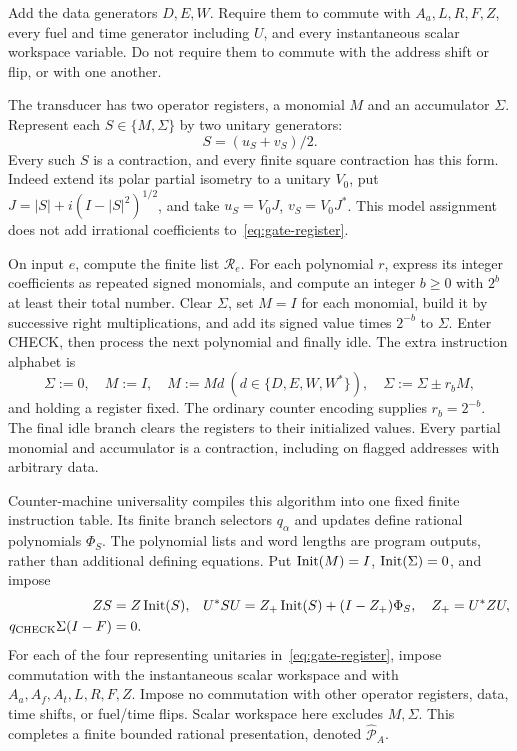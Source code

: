 Add the data generators $D,E,W$. Require them to commute with $A_a,L,R,F,Z$, every fuel and time generator including $U$, and every instantaneous scalar workspace variable. Do not require them to commute with the address shift or flip, or with one another.

The transducer has two operator registers, a monomial $M$ and an accumulator $\Sigma$. Represent each $S\in\{M,\Sigma\}$ by two unitary generators:
\begin{equation}\label{eq:gate-register}
 S=(u_S+v_S)/2.
\end{equation}
Every such $S$ is a contraction, and every finite square contraction has this form. Indeed extend its polar partial isometry to a unitary $V_0$, put $J=|S|+i(I-|S|^2)^{1/2}$, and take $u_S=V_0J$, $v_S=V_0J^*$. This model assignment does not add irrational coefficients to~\eqref{eq:gate-register}.

On input $e$, compute the finite list $\mathcal R_e$. For each polynomial $r$, express its integer coefficients as repeated signed monomials, and compute an integer $b\ge0$ with $2^b$ at least their total number. Clear $\Sigma$, set $M=I$ for each monomial, build it by successive right multiplications, and add its signed value times $2^{-b}$ to $\Sigma$. Enter CHECK, then process the next polynomial and finally idle. The extra instruction alphabet is
\[
 \Sigma:=0,\quad M:=I,\quad M:=Md\ (d\in\{D,E,W,W^*\}),\quad
 \Sigma:=\Sigma\pm r_bM,
\]
and holding a register fixed. The ordinary counter encoding supplies $r_b=2^{-b}$. The final idle branch clears the registers to their initialized values. Every partial monomial and accumulator is a contraction, including on flagged addresses with arbitrary data.

Counter-machine universality compiles this algorithm into one fixed finite instruction table. Its finite branch selectors $q_\alpha$ and updates define rational polynomials $\Phi_S$. The polynomial lists and word lengths are program outputs, rather than additional defining equations. Put $\operatorname{Init}(M)=I$, $\operatorname{Init}(\Sigma)=0$, and impose
\begin{align}
 ZS&=Z\operatorname{Init}(S),&
 U^*SU&=Z_+\operatorname{Init}(S)+(I-Z_+)\Phi_S,\quad Z_+=U^*ZU,\label{eq:gate-transition}\\
 q_{\rm CHECK}\Sigma(I-F)&=0.&&\label{eq:gate-check}
\end{align}
For each of the four representing unitaries in~\eqref{eq:gate-register}, impose commutation with the instantaneous scalar workspace and with $A_a,A_f,A_t,L,R,F,Z$. Impose no commutation with other operator registers, data, time shifts, or fuel/time flips. Scalar workspace here excludes $M,\Sigma$. This completes a finite bounded rational presentation, denoted $\widehat{\mathcal P}_A$.

